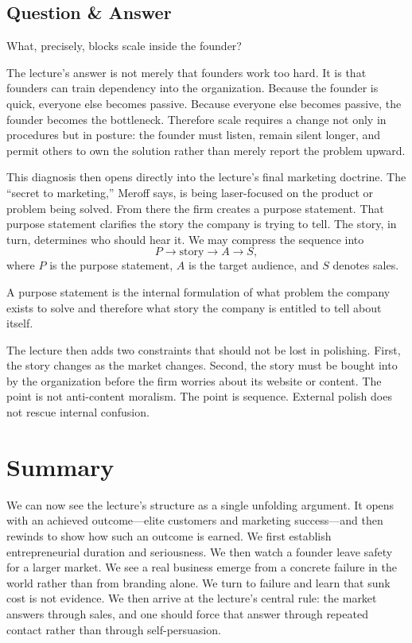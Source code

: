 \subsection{Question \& Answer}

What, precisely, blocks scale inside the founder?

The lecture's answer is not merely that founders work too hard. It is that founders can train dependency into the organization. Because the founder is quick, everyone else becomes passive. Because everyone else becomes passive, the founder becomes the bottleneck. Therefore scale requires a change not only in procedures but in posture: the founder must listen, remain silent longer, and permit others to own the solution rather than merely report the problem upward.

This diagnosis then opens directly into the lecture's final marketing doctrine. The ``secret to marketing,'' Meroff says, is being laser-focused on the product or problem being solved. From there the firm creates a purpose statement. That purpose statement clarifies the story the company is trying to tell. The story, in turn, determines who should hear it. We may compress the sequence into
\begin{equation}
P
\longrightarrow
\text{story}
\longrightarrow
A
\longrightarrow
S,
\end{equation}
where $P$ is the purpose statement, $A$ is the target audience, and $S$ denotes sales.

\begin{definition}
A purpose statement is the internal formulation of what problem the company exists to solve and therefore what story the company is entitled to tell about itself.
\end{definition}

The lecture then adds two constraints that should not be lost in polishing. First, the story changes as the market changes. Second, the story must be bought into by the organization before the firm worries about its website or content. The point is not anti-content moralism. The point is sequence. External polish does not rescue internal confusion.

\section{Summary}

We can now see the lecture's structure as a single unfolding argument. It opens with an achieved outcome---elite customers and marketing success---and then rewinds to show how such an outcome is earned. We first establish entrepreneurial duration and seriousness. We then watch a founder leave safety for a larger market. We see a real business emerge from a concrete failure in the world rather than from branding alone. We turn to failure and learn that sunk cost is not evidence. We then arrive at the lecture's central rule: the market answers through sales, and one should force that answer through repeated contact rather than through self-persuasion.

